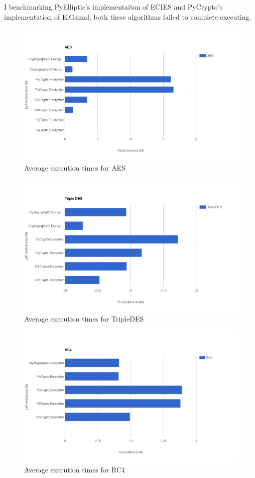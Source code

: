 \documentclass[10pt,conference]{IEEEtran}
\begin{document}
I benchmarking PyElliptic's implementaiton of ECIES and  PyCrypto's implementation of ElGamal, both these algorithms failed to complete executing.



\begin{figure}
\centering
\includegraphics[width=0.7\linewidth]{./aes}
\caption{Average execution times for AES}
\label{fig:aes}
\end{figure}


\begin{figure}
\centering
\includegraphics[width=0.7\linewidth]{./tripledes}
\caption{Average execution times for TripleDES}
\label{fig:tripledes}
\end{figure}



\begin{figure}
\centering
\includegraphics[width=0.7\linewidth]{./rc4}
\caption{Average execution times for RC4}
\label{fig:rc4}
\end{figure}
\end{document}
